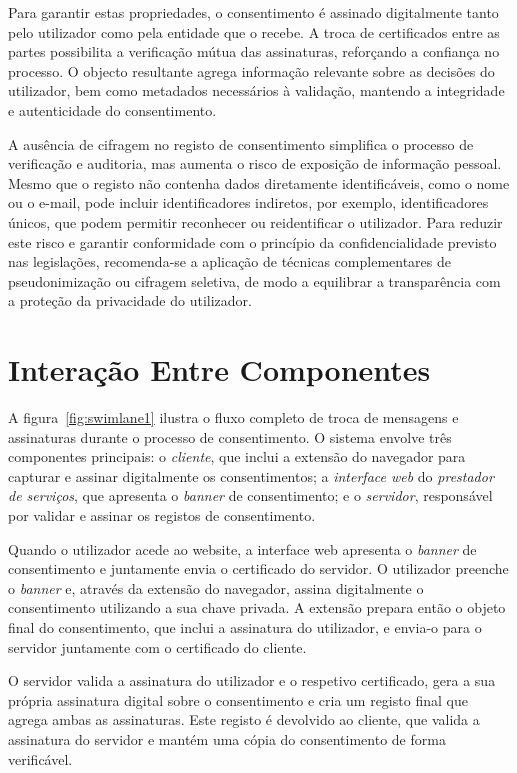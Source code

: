 Para garantir estas propriedades, o consentimento é assinado digitalmente tanto pelo utilizador como pela entidade que o recebe. A troca de certificados entre as partes possibilita a verificação mútua das assinaturas, reforçando a confiança no processo. O objecto resultante agrega informação relevante sobre as decisões do utilizador, bem como metadados necessários à validação, mantendo a integridade e autenticidade do consentimento.

A ausência de cifragem no registo de consentimento simplifica o processo de verificação e auditoria, mas aumenta o risco de exposição de informação pessoal. Mesmo que o registo não contenha dados diretamente identificáveis, como o nome ou o e-mail, pode incluir identificadores indiretos, por exemplo, identificadores únicos, que podem permitir reconhecer ou reidentificar o utilizador. Para reduzir este risco e garantir conformidade com o princípio da confidencialidade previsto nas legislações, recomenda-se a aplicação de técnicas complementares de pseudonimização ou cifragem seletiva, de modo a equilibrar a transparência com a proteção da privacidade do utilizador.

\section{Interação Entre Componentes}

A figura~\ref{fig:swimlane1} ilustra o fluxo completo de troca de mensagens e assinaturas durante o processo de consentimento. O sistema envolve três componentes principais: o \textit{cliente}, que inclui a extensão do navegador para capturar e assinar digitalmente os consentimentos; a \textit{interface web} do \textit{prestador de serviços}, que apresenta o \textit{banner} de consentimento; e o \textit{servidor}, responsável por validar e assinar os registos de consentimento.

Quando o utilizador acede ao website, a interface web apresenta o \textit{banner} de consentimento e juntamente envia o certificado do servidor. O utilizador preenche o \textit{banner} e, através da extensão do navegador, assina digitalmente o consentimento utilizando a sua chave privada. A extensão prepara então o objeto final do consentimento, que inclui a assinatura do utilizador, e envia-o para o servidor juntamente com o certificado do cliente.

O servidor valida a assinatura do utilizador e o respetivo certificado, gera a sua própria assinatura digital sobre o consentimento e cria um registo final que agrega ambas as assinaturas. Este registo é devolvido ao cliente, que valida a assinatura do servidor e mantém uma cópia do consentimento de forma verificável.

